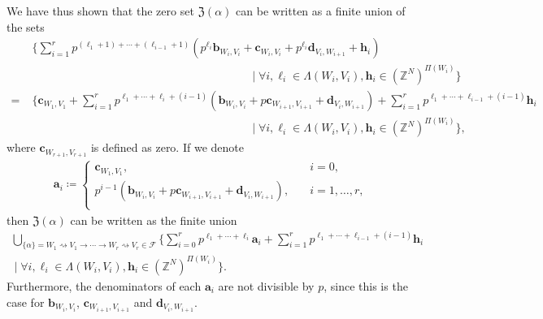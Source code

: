 \documentclass[letterpaper, 11pt, thm-restate]{article}
\numberwithin{equation}{section}
\newcommand{\Z}{\mathbb{Z}}
\newcommand{\mF}{\mathcal{F}}
\newcommand{\mZ}{\mathfrak{Z}}
\newcommand{\ba}{\boldsymbol{a}}
\newcommand{\bb}{\boldsymbol{b}}
\newcommand{\bc}{\boldsymbol{c}}
\newcommand{\bd}{\boldsymbol{d}}
\newcommand{\bh}{\boldsymbol{h}}
\theoremstyle{definition}
\theoremstyle{definition}
\theoremstyle{definition}
\begin{document}
We have thus shown that the zero set $\mZ(\alpha)$ can be written as a finite union of the sets
\begin{align*}
        & \Bigg\{\sum_{i = 1}^r p^{(\ell_1 + 1) + \cdots + (\ell_{i-1} + 1)} \left(p^{\ell_i} \bb_{W_i, V_i} + \bc_{W_i, V_i} + p^{\ell_i} \bd_{V_i, W_{i+1}} + \bh_i \right) \\
        & \hspace{8cm}\;\Bigg|\; \forall i, \ell_i \in \Lambda(W_i, V_i), \bh_i \in (\Z^N)^{\Pi(W_i)} \Bigg\} \\
        = \; & \Bigg\{\bc_{W_1, V_1} + \sum_{i = 1}^r p^{\ell_1 + \cdots + \ell_{i} + (i-1)} \left(\bb_{W_i, V_i} + p \bc_{W_{i+1}, V_{i+1}} + \bd_{V_i, W_{i+1}} \right) + \sum_{i = 1}^r  p^{\ell_1 + \cdots + \ell_{i-1} + (i-1)} \bh_{i}\\
        & \hspace{8cm} \;\Bigg|\; \forall i, \ell_i \in \Lambda(W_i, V_i), \bh_i \in (\Z^N)^{\Pi(W_i)} \Bigg\}, 
\end{align*}
where $\bc_{W_{r+1}, V_{r+1}}$ is defined as zero.
If we denote
\begin{align}\label{eq:defa}
\ba_{i} \coloneqq 
\begin{cases}
    \bc_{W_1, V_1}, & \quad i = 0, \\
    p^{i-1}\left( \bb_{W_i, V_i} + p \bc_{W_{i+1}, V_{i+1}} + \bd_{V_i, W_{i+1}} \right), & \quad i = 1, \ldots, r,\\
\end{cases}
\end{align}
then $\mZ(\alpha)$ can be written as the finite union
\begin{multline}\label{eq:proto}
    \bigcup_{\{\alpha\} = W_1 \rightsquigarrow V_1 \rightarrow \cdots \rightarrow W_r \rightsquigarrow V_r \in \mF} \Bigg\{\sum_{i = 0}^r p^{\ell_1 + \cdots + \ell_{i}} \ba_i + \sum_{i = 1}^r p^{\ell_1 + \cdots + \ell_{i-1} + (i-1)} \bh_i \\
        \;\Bigg|\; \forall i, \ell_i \in \Lambda(W_i, V_i), \bh_i \in (\Z^N)^{\Pi(W_i)} \Bigg\}.
\end{multline}
Furthermore, the denominators of each $\ba_i$ are not divisible by $p$, since this is the case for $\bb_{W_i, V_i}$, $\bc_{W_{i+1}, V_{i+1}}$ and $\bd_{V_i, W_{i+1}}$.
\end{document}
